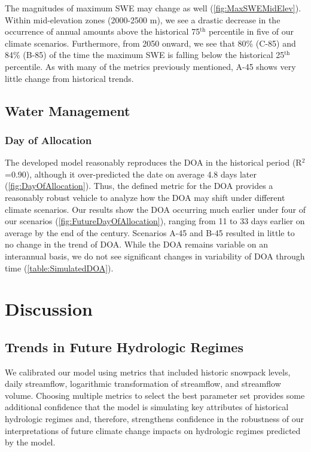 \documentclass[water,article,submit,moreauthors,pdftex,10pt,a4paper]{mdpi}
\theoremstyle{mdpi}
\newcounter{thm}
\newcounter{ex}
\newcounter{re}
\theoremstyle{mdpidefinition}
\begin{document}
The magnitudes of maximum SWE may change as well (\cref{fig:MaxSWEMidElev}). Within mid-elevation zones (2000-2500 m), we see a drastic decrease in the occurrence of annual amounts above the historical 75${}^\textrm{th}$ percentile in five of our climate scenarios. Furthermore, from 2050 onward, we see that 80\% (C-85) and 84\% (B-85) of the time the maximum SWE is falling below the historical 25${}^\textrm{th}$ percentile. As with many of the metrics previously mentioned, A-45 shows very little change from historical trends.

\subsection{Water Management}

\subsubsection{Day of Allocation}

The developed model reasonably reproduces the DOA in the historical period (R${}^2$=0.90), although it over-predicted the date on average 4.8 days later (\cref{fig:DayOfAllocation}). Thus, the defined metric for the DOA provides a reasonably robust vehicle to analyze how the DOA may shift under different climate scenarios.
Our results show the DOA occurring much earlier under four of our scenarios (\cref{fig:FutureDayOfAllocation}), ranging from 11 to 33 days earlier on average by the end of the century. Scenarios A-45 and B-45 resulted in little to no change in the trend of DOA. While the DOA remains variable on an interannual basis, we do not see significant changes in variability of DOA through time (\cref{table:SimulatedDOA}).

\section{Discussion}

\subsection{Trends in Future Hydrologic Regimes}

We calibrated our model using metrics that included historic snowpack levels, daily streamflow, logarithmic transformation of streamflow, and streamflow volume. Choosing multiple metrics to select the best parameter set provides some additional confidence that the model is simulating key attributes of historical hydrologic regimes and, therefore, strengthens confidence in the robustness of our interpretations of future climate change impacts on hydrologic regimes predicted by the model. 
\end{document}
